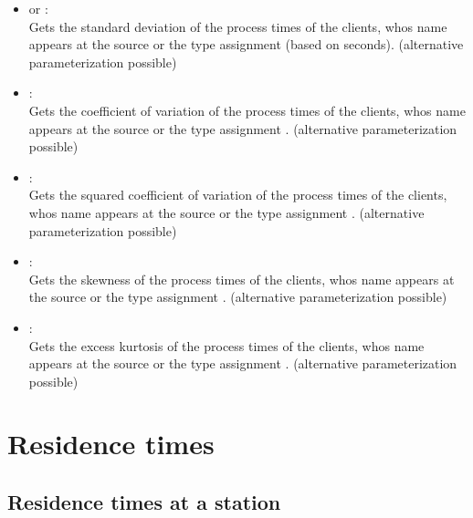 \begin{itemize}
\item
{} or :\\
Gets the standard deviation of the process times of the clients, whos name appears at the source or the type assignment  (based on seconds).
(alternative parameterization possible)

\item
{}:\\
Gets the coefficient of variation of the process times of the clients, whos name appears at the source or the type assignment .
(alternative parameterization possible)

\item
{}:\\
Gets the squared coefficient of variation of the process times of the clients, whos name appears at the source or the type assignment .
(alternative parameterization possible)

\item
{}:\\
Gets the skewness of the process times of the clients, whos name appears at the source or the type assignment .
(alternative parameterization possible)

\item
{}:\\
Gets the excess kurtosis of the process times of the clients, whos name appears at the source or the type assignment .
(alternative parameterization possible)

\end{itemize}



\section{Residence times}



\subsection{Residence times at a station}

